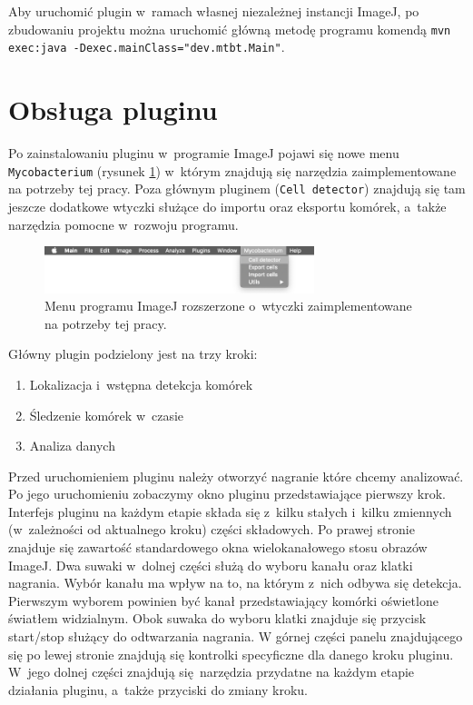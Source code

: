 \documentclass[declaration,shortabstract,mgr]{iithesis}
\begin{document}
Aby uruchomić plugin w~ramach własnej niezależnej instancji ImageJ, po zbudowaniu projektu można uruchomić główną metodę programu komendą
\linebreak\texttt{mvn exec:java -Dexec.mainClass="dev.mtbt.Main"}.


\section{Obsługa pluginu}
\label{sec:user-manual}

Po zainstalowaniu pluginu w~programie ImageJ pojawi się nowe menu \texttt{Mycobacterium} (rysunek \ref{fig:ui-menu}) w~którym znajdują się narzędzia zaimplementowane na potrzeby tej pracy. Poza głównym pluginem (\texttt{Cell detector}) znajdują się tam jeszcze dodatkowe wtyczki służące do importu oraz eksportu komórek, a~także narzędzia pomocne w~rozwoju programu.
\begin{figure}
  \centering
  \includegraphics[width=0.7\textwidth]{images/ui-menu.png}
  \caption{Menu programu ImageJ rozszerzone o~wtyczki zaimplementowane na potrzeby tej pracy.}
  \label{fig:ui-menu}
\end{figure}
Główny plugin podzielony jest na trzy kroki:


\begin{enumerate}
  \item Lokalizacja i~wstępna detekcja komórek
  \item Śledzenie komórek w~czasie
  \item Analiza danych
\end{enumerate}

Przed uruchomieniem pluginu należy otworzyć nagranie które chcemy analizować. Po jego uruchomieniu zobaczymy okno pluginu przedstawiające pierwszy krok.
Interfejs pluginu na każdym etapie składa się z~kilku stałych i~kilku zmiennych (w~zależności od aktualnego kroku) części składowych.
Po prawej stronie znajduje się zawartość standardowego okna wielokanałowego stosu obrazów ImageJ.
Dwa suwaki w~dolnej części służą do wyboru kanału oraz klatki nagrania.
Wybór kanału ma wpływ na to, na którym z~nich odbywa się detekcja.
Pierwszym wyborem powinien być kanał przedstawiający komórki oświetlone światłem widzialnym.
Obok suwaka do wyboru klatki znajduje się przycisk start/stop służący do odtwarzania nagrania.
W górnej części panelu znajdującego się po lewej stronie znajdują się kontrolki specyficzne dla danego kroku pluginu. W~jego dolnej części znajdują się narzędzia przydatne na każdym etapie działania pluginu, a~także przyciski do zmiany kroku.
\end{document}

